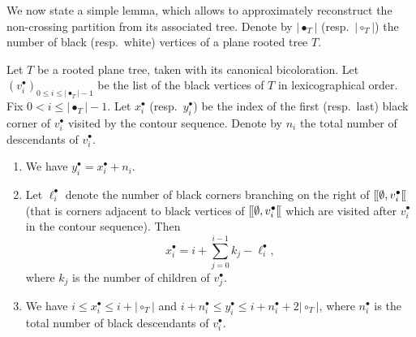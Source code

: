 \documentclass[10pt]{amsart}
\theoremstyle{definition}\newtheorem{defi}[theo]{Definition}\newtheorem{rema}[theo]{Remark}\newtheorem{exam}[theo]{Example}\newtheorem{exem}[theo]{Example}\newtheorem{nota}[theo]{Notation}
\providecommand{\abs}[1]{\lvert#1\rvert}
\def\llbracket{[\hspace{-.10em} [ }
\begin{document}
We now state a simple lemma, which allows to approximately reconstruct  the non-crossing partition from its associated tree. Denote by $\abs{\bullet_{T}}$  (resp.~$\abs{\circ_{T}}$)  the number of black (resp.~white) vertices of a plane rooted tree $T$.


\begin{lemma}
  \label{lem:OnBlockLabels}
Let $T$ be a rooted plane tree, taken with its canonical bicoloration.  Let $ (v^{\bullet}_{i})_{0 \leq i \leq \abs{\bullet_{T}}-1 }$ be the list of the black vertices of $T$ in lexicographical order.
  Fix $ 0 < i \leq \abs{\bullet_{T}}-1$. Let $x^{\bullet}_{i}$ (resp.~$y^{\bullet}_{i}$) be the index of the first (resp.~last) black corner of $v^{\bullet}_i$ visited by the contour sequence. Denote by $n_{i}$ the total number of  descendants of $v^{\bullet}_{i}$.
 \begin{enumerate}
 \item[(i)] We have   $y^{\bullet}_{i}=x^{\bullet}_{i}+n_{i}$.
  \item[(ii)] Let $\ell_{i}^{\bullet}$ denote the number of black corners  branching on the right of  $\llbracket \emptyset, v^{\bullet}_{i} \llbracket$ (that is corners  adjacent to black vertices of $\llbracket \emptyset, v^{\bullet}_{i} \llbracket$  which are visited after $v^{\bullet}_{i}$ in the contour sequence). Then
   \[ x^{\bullet}_{i}= i+\sum_{j=0}^{i-1} k_{j} - \ell_{i}^{\bullet},\]
   where $k_{j}$ is the number of children of $v^{\bullet}_{j}$.
  \item[(iii)] We have $ i \leq x^{\bullet}_{i} \leq i+ \abs{\circ_{T}}$ and $ i +n^{\bullet}_{i}\leq y^{\bullet}_{i} \leq i+n^{\bullet}_{i}+ 2 \abs{\circ_{T}}$, where  $n^{\bullet}_{i}$ is the total number of black descendants of $v^{\bullet}_{i}$.
 \end{enumerate}
  \end{lemma}
\end{document}
